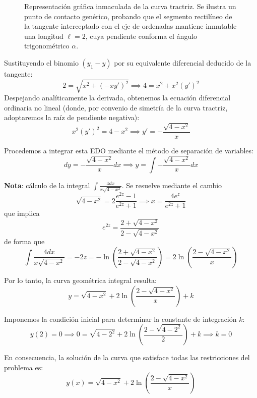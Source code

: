 \documentclass[11pt,a4paper]{article}
\theoremstyle{definition}
\theoremstyle{plain}
\begin{document}
\begin{tcolorbox}
\begin{figure}[H]
    \caption{Representación gráfica inmaculada de la curva tractriz. Se ilustra un punto de contacto genérico, probando que el segmento rectilíneo de la tangente interceptado con el eje de ordenadas mantiene inmutable una longitud $\ell=2$, cuya pendiente conforma el ángulo trigonométrico $\alpha$.}
\end{figure}

Sustituyendo el binomio $(y_1 - y)$ por su equivalente diferencial deducido de la tangente:
$$ 2 = \sqrt{x^2 + (-xy')^2} \implies 4 = x^2 + x^2(y')^2 $$
Despejando analíticamente la derivada, obtenemos la ecuación diferencial ordinaria no lineal (donde, por convenio de simetría de la curva tractriz, adoptaremos la raíz de pendiente negativa):
$$ x^2(y')^2 = 4 - x^2 \implies y' = -\frac{\sqrt{4 - x^2}}{x} $$

Procedemos a integrar esta EDO mediante el método de separación de variables:
$$ dy = -\frac{\sqrt{4 - x^2}}{x} dx \implies y = \int -\frac{\sqrt{4 - x^2}}{x} dx $$

\textbf{Nota}: cálculo de la integral $\int \frac{4dx}{x\sqrt{4-x^2}}$. Se resuelve mediante el cambio
$$ \sqrt{4-x^2} = 2 \frac{e^{2z}-1}{e^{2z}+1} \implies x = \frac{4e^z}{e^{2z}+1} $$
que implica
$$ e^{2z} = \frac{2+\sqrt{4-x^2}}{2-\sqrt{4-x^2}} $$
de forma que
$$ \int \frac{4dx}{x\sqrt{4-x^2}} = -2z = -\ln \left( \frac{2+\sqrt{4-x^2}}{2-\sqrt{4-x^2}} \right) = 2\ln\left( \frac{2-\sqrt{4-x^2}}{x} \right) $$

Por lo tanto, la curva geométrica integral resulta:
$$ y = \sqrt{4 - x^2} + 2\ln\left( \frac{2 - \sqrt{4 - x^2}}{x} \right) + k $$

Imponemos la condición inicial para determinar la constante de integración $k$:
$$ y(2)=0 \implies 0 = \sqrt{4 - 2^2} + 2\ln\left( \frac{2 - \sqrt{4 - 2^2}}{2} \right) + k \implies k = 0 $$

En consecuencia, la solución de la curva que satisface todas las restricciones del problema es:
$$ y(x) = \sqrt{4 - x^2} + 2\ln\left( \frac{2 - \sqrt{4 - x^2}}{x} \right) $$


\end{tcolorbox}
\end{document}

